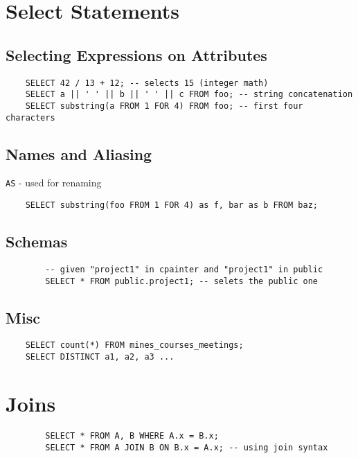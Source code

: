 \documentclass{cheatsheet}
\begin{document}
\begin{multicols*}{2}
    \section{Select Statements}
    \subsection{Selecting Expressions on Attributes}
    \begin{verbatim}
    SELECT 42 / 13 + 12; -- selects 15 (integer math)
    SELECT a || ' ' || b || ' ' || c FROM foo; -- string concatenation
    SELECT substring(a FROM 1 FOR 4) FROM foo; -- first four characters
    \end{verbatim}

    \subsection{Names and Aliasing}
    \texttt{AS} - used for renaming

    \begin{verbatim}
    SELECT substring(foo FROM 1 FOR 4) as f, bar as b FROM baz;
    \end{verbatim}

    \subsection{Schemas}
    \begin{verbatim}
        -- given "project1" in cpainter and "project1" in public
        SELECT * FROM public.project1; -- selets the public one
    \end{verbatim}

    \subsection{Misc}
    \begin{verbatim}
    SELECT count(*) FROM mines_courses_meetings;
    SELECT DISTINCT a1, a2, a3 ...
    \end{verbatim}

    \section{Joins}
    \begin{verbatim}
        SELECT * FROM A, B WHERE A.x = B.x;
        SELECT * FROM A JOIN B ON B.x = A.x; -- using join syntax
    \end{verbatim}


\end{multicols*}
\end{document}
